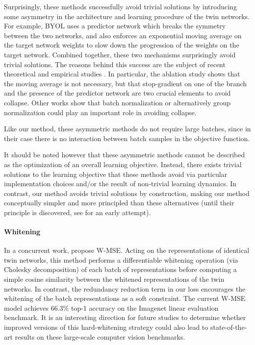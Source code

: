 \documentclass{article}
\begin{document}
Surprisingly, these methods successfully avoid trivial solutions by introducing some asymmetry in the architecture and learning procedure of the twin networks. For example, \textsc{BYOL} uses a predictor network which breaks the symmetry between the two networks, and also enforces an exponential moving average on the target network weights to slow down the progression of the weights on the target network. Combined together, these two mechanisms surprisingly avoid trivial solutions. The reasons behind this success are the subject of recent theoretical and empirical studies \cite{tian_understanding_2020,chen2020exploring,fetterman_understanding_2020,richemond_byol_2020}. In particular, the ablation study \cite{chen2020exploring} shows that the moving average is not necessary, but that stop-gradient on one of the branch and the presence of the predictor network are two crucial elements to avoid collapse. Other works show that batch normalization \cite{tian_understanding_2020,fetterman_understanding_2020} or alternatively group normalization \cite{richemond_byol_2020} could play an important role in avoiding collapse.

Like our method, these asymmetric methods do not require large batches, since in their case there is no interaction between batch samples in the objective function.

It should be noted however that these asymmetric methods cannot be described as the optimization of an overall learning objective. Instead, there exists trivial solutions to the learning objective that these methods avoid via particular implementation choices and/or the result of non-trivial learning dynamics. In contrast, our method avoids trivial solutions by construction, making our method conceptually simpler and more principled than these alternatives (until their principle is discovered, see \cite{tian_understanding_2021} for an early attempt).

 

\paragraph{Whitening}
In a concurrent work, \cite{ermolov_whitening_2020} propose \textsc{W-MSE}. Acting on the representations of identical twin networks, this method performs a differentiable whitening operation (via Cholesky decomposition) of each batch of representations before computing a simple cosine similarity between the whitened representations of the twin networks. In contrast, the redundancy reduction term in our loss encourages the whitening of the batch representations as a soft constraint. The current W-MSE model achieves 66.3\% top-1 accuracy on the Imagenet linear evaluation benchmark. It is an interesting direction for future studies to determine whether improved versions of this hard-whitening strategy could also lead to state-of-the-art results on these large-scale computer vision benchmarks.
\end{document}

